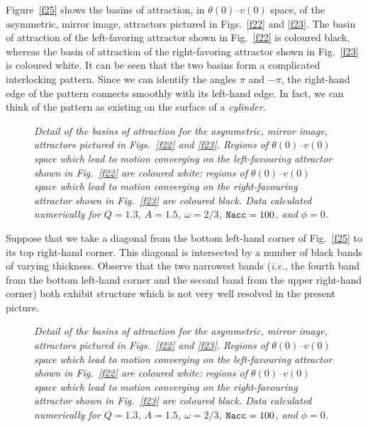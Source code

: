 Figure~\ref{f25} shows the basins of attraction, in $\theta(0)$--$v(0)$ space, 
of the asymmetric, mirror image, attractors
pictured in Figs.~\ref{f22} and \ref{f23}. The basin of attraction
of  the left-favoring attractor shown in Fig.~\ref{f22} is coloured black, whereas
the basin of attraction
of  the right-favoring attractor shown in Fig.~\ref{f23} is coloured  white. It can
be seen that the two basins form a complicated interlocking pattern. Since we can
identify the angles $\pi$ and $-\pi$, the right-hand edge of the pattern connects
smoothly with its left-hand edge. In fact, we can think of the pattern as existing
on the surface of a {\em cylinder}.

\begin{figure}
\epsfysize=4in
\centerline{}
\caption{\em  Detail of the basins of attraction for the asymmetric, mirror image, attractors
pictured in Figs.~\ref{f22} and \ref{f23}. Regions of $\theta(0)$--$v(0)$
space which lead to motion converging on the left-favouring attractor shown
in Fig.~\ref{f22} are coloured white: regions of $\theta(0)$--$v(0)$
space which lead to motion converging on the right-favouring attractor shown
in Fig.~\ref{f23} are coloured black. Data calculated numerically
for $Q=1.3$, $A=1.5$, $\omega=2/3$, ${\tt Nacc} =100$, and $\phi=0$.
}\label{f26}
\end{figure}

Suppose that we take a diagonal from the bottom left-hand corner of Fig.~\ref{f25}
to its top right-hand corner. This diagonal is intersected by a number of black
bands of varying thickness. Observe that the two narrowest bands ({\em i.e.}, the
fourth band from the bottom left-hand corner and the second band from the
upper right-hand corner) both exhibit structure which is not very well resolved in the
present picture. 

\begin{figure}
\epsfysize=4in
\centerline{}
\caption{\em  Detail of the basins of attraction for the asymmetric, mirror image, attractors
pictured in Figs.~\ref{f22} and \ref{f23}. Regions of $\theta(0)$--$v(0)$
space which lead to motion converging on the left-favouring attractor shown
in Fig.~\ref{f22} are coloured white: regions of $\theta(0)$--$v(0)$
space which lead to motion converging on the right-favouring attractor shown
in Fig.~\ref{f23} are coloured black. Data calculated numerically
for $Q=1.3$, $A=1.5$, $\omega=2/3$, ${\tt Nacc} =100$, and $\phi=0$.
}\label{f27}
\end{figure}

